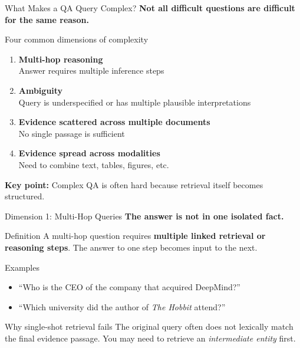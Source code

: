 \documentclass[aspectratio=169, xcolor=table]{beamer}
\newif\ifanimated
\newcommand{\cpause}{\ifanimated\pause\fi}
\begin{document}
\begin{frame}[plain]
\sectionpage
\end{frame}

\begin{frame}[shrink=10]{What Makes a QA Query Complex?}
\textbf{Not all difficult questions are difficult for the same reason.}

\vspace{0.8em}
\begin{block}{Four common dimensions of complexity}
\begin{enumerate}
  \item \textbf{Multi-hop reasoning} \\
  Answer requires multiple inference steps
  \item \textbf{Ambiguity} \\
  Query is underspecified or has multiple plausible interpretations
  \item \textbf{Evidence scattered across multiple documents} \\
  No single passage is sufficient
  \item \textbf{Evidence spread across modalities} \\
  Need to combine text, tables, figures, etc.
\end{enumerate}
\end{block}

\cpause
\vspace{0.4em}
\textbf{Key point:} Complex QA is often hard because retrieval itself becomes structured.
\end{frame}

\begin{frame}[shrink=10]{Dimension 1: Multi-Hop Queries}
\textbf{The answer is not in one isolated fact.}

\vspace{0.7em}
\begin{block}{Definition}
A multi-hop question requires \textbf{multiple linked retrieval or reasoning steps}.
The answer to one step becomes input to the next.
\end{block}

\cpause
\begin{block}{Examples}
\begin{itemize}
  \item ``Who is the CEO of the company that acquired DeepMind?''
  \item ``Which university did the author of \emph{The Hobbit} attend?''
\end{itemize}
\end{block}

\cpause
\begin{block}{Why single-shot retrieval fails}
The original query often does not lexically match the final evidence passage.
You may need to retrieve an \emph{intermediate entity} first.
\end{block}
\end{frame}
\end{document}
